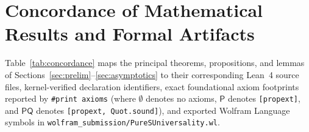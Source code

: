 \documentclass[11pt,reqno]{amsart}
\numberwithin{equation}{section}
\theoremstyle{plain}
\theoremstyle{definition}
\theoremstyle{remark}
\begin{document}

\appendix

\section{Concordance of Mathematical Results and Formal Artifacts}
\label{app:concordance}

Table~\ref{tab:concordance} maps the principal theorems, propositions, and lemmas of Sections~\ref{sec:prelim}--\ref{sec:asymptotics} to their corresponding Lean~4 source files, kernel-verified declaration identifiers, exact foundational axiom footprints reported by \texttt{\#print axioms} (where $\emptyset$ denotes no axioms, $\mathsf{P}$ denotes \texttt{[propext]}, and $\mathsf{PQ}$ denotes \texttt{[propext, Quot.sound]}), and exported Wolfram Language symbols in \texttt{wolfram\_submission/PureSUniversality.wl}.
\end{document}
